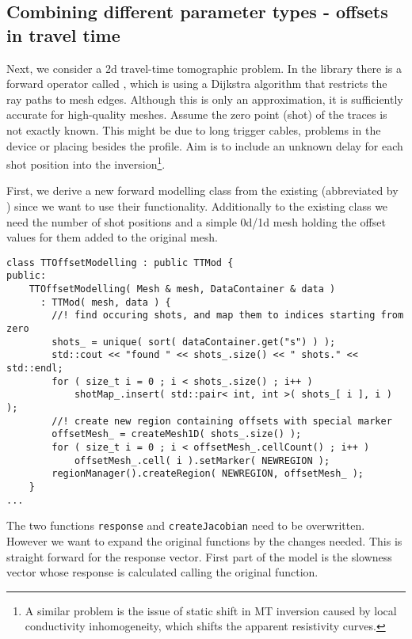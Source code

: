 \subsection{Combining different parameter types - offsets in travel time}\label{sec:ttoffset}
Next, we consider a 2d travel-time tomographic problem.
In the library there is a forward operator called , which is using a Dijkstra \citep{dijkstra} algorithm that restricts the ray paths to mesh edges. Although this is only an approximation, it is sufficiently accurate for high-quality meshes.
Assume the zero point (shot) of the traces is not exactly known. This might be due to long trigger cables, problems in the device or placing besides the profile.
Aim is to include an unknown delay for each shot position into the inversion\footnote{A similar problem is the issue of static shift in MT inversion caused by local conductivity inhomogeneity, which shifts the apparent resistivity curves.}.

First, we derive a new forward modelling class   from the existing  (abbreviated by ) since we want to use their functionality.
Additionally to the existing class we need the number of shot positions and a simple 0d/1d mesh holding the offset values for them added to the original mesh.
\begin{lstlisting}
class TTOffsetModelling : public TTMod {
public:
    TTOffsetModelling( Mesh & mesh, DataContainer & data )
      : TTMod( mesh, data ) {
        //! find occuring shots, and map them to indices starting from zero
        shots_ = unique( sort( dataContainer.get("s") ) );
        std::cout << "found " << shots_.size() << " shots." << std::endl;
        for ( size_t i = 0 ; i < shots_.size() ; i++ )
            shotMap_.insert( std::pair< int, int >( shots_[ i ], i ) );
        //! create new region containing offsets with special marker
        offsetMesh_ = createMesh1D( shots_.size() );
        for ( size_t i = 0 ; i < offsetMesh_.cellCount() ; i++ )
            offsetMesh_.cell( i ).setMarker( NEWREGION );
        regionManager().createRegion( NEWREGION, offsetMesh_ );
    }
...
\end{lstlisting}

The two functions \lstinline|response| and \lstinline|createJacobian| need to be overwritten.
However we want to expand the original functions by the changes needed.
This is straight forward for the response vector.
First part of the model is the slowness vector whose response is calculated calling the original function.

